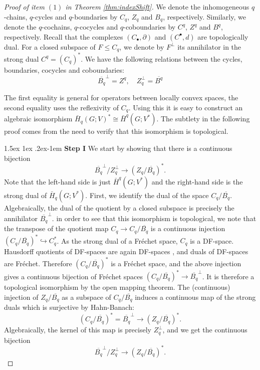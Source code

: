 \documentclass[12pt,reqno]{amsart}
\makeatletter
\theoremstyle{definition}
\renewcommand\paragraph{\@startsection{paragraph}{4}{\z@}%
  {1.5ex \@plus 1ex \@minus .2ex}{-1em}%
  {\normalfont\normalsize\bfseries}}
\makeatother
\begin{document}
\begin{proof}[Proof of item $(1)$ in Theorem \ref{thm:indexShift}]
We denote the inhomogeneous $q$-chains, $q$-cycles and $q$-boundaries by $C_q$, $Z_q$ and $B_q$, respectively. Similarly, we denote the $q$-cochains, $q$-cocycles and $q$-coboundaries by $C^q$, $Z^q$ and $B^q$, respectively. Recall that the complexes $(C_\bullet,\partial)$ and $(C^\bullet,d)$ are topologically dual. For a closed subspace of $F \leq C_q$, we denote by $F^\perp$ its annihilator in the strong dual $C^q=(C_q)^*$. We have the following relations between the cycles, boundaries, cocycles and coboundaries: 
$$\overline{B_q}^\perp=Z^q, \quad Z_q^\perp=\overline{B^q}$$

The first equality is general for operators between locally convex spaces, the second equality uses the reflexivity of $C_q$. Using this it is easy to construct an algebraic isomorphism $\bar{H}_q(G;V)^* \cong \bar{H}^q(G;V^*)$. The subtlety in the following proof comes from the need to verify that this isomorphism is topological.

\paragraph{\textbf{Step I}} We start by showing that there is a continuous bijection
$$\overline{B_q}^\perp / Z_q^\perp \rightarrow (Z_q / \overline{B_q})^*.$$
Note that the left-hand side is just $\bar{H}^q(G;V^*)$ and the right-hand side is the strong dual of $\bar{H}_q(G;V^*)$. First, we identify the dual of the space $C_q/\overline{B_q}$. Algebraically, the dual of the quotient by a closed subspace is precisely the annihilator $\overline{B_q}^\perp$. in order to see that this isomorphism is topological, we note that the transpose of the quotient map $C_q \to C_q/ \overline{B_q}$ is a continuous injection $(C_q/\overline{B_q})^* \hookrightarrow C_q^*$. As the strong dual of a Fr\'echet space, $C_q$ is a DF-space. Hausdorff quotients of DF-spaces are again DF-spaces \cite[Proposition~8.3.16]{BonerPerezcarreras}, and duals of DF-spaces are Fr\'echet. Therefore $(C_q/\overline{B_q})^*$ is a Fr\'echet space, and the above injection gives a continuous bijection of Fr\'echet spaces $(C_q/\overline{B_q})^* \to\overline{B_q}^\perp$. It is therefore a topological isomorphism by the open mapping theorem. The (continuous) injection of $Z_q / \overline{B_q}$ as a subspace of $C_q / \overline{B_q}$ induces a continuous map of the strong duals which is surjective by Hahn-Banach:
$$(C_q / \overline{B_q})^*=\overline{B_q}^\perp \to (Z_q / \overline{B_q})^*.$$
Algebraically, the kernel of this map is precisely $Z_q^\perp$, and we get the continuous bijection
$$\overline{B_q}^\perp / Z_q^\perp \rightarrow (Z_q / \overline{B_q})^*.$$

\end{proof}
\end{document}
